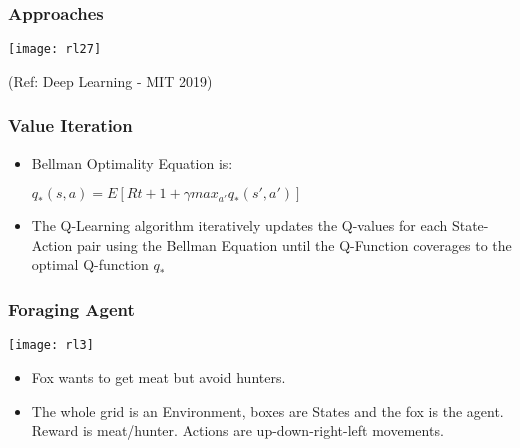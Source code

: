 \begin{frame}[fragile]\frametitle{Approaches}
\begin{center}
\texttt{[image: rl27]}
\end{center}

{\tiny (Ref: Deep Learning - MIT 2019)}

\end{frame}

\begin{frame}[fragile]\frametitle{Value Iteration}

\begin{itemize}
\item Bellman Optimality Equation is:

$q_{*}(s,a) = E[R{t+1} + \gamma max_{a'} q_{*}(s',a')]$


\item The Q-Learning algorithm iteratively updates the Q-values for each State-Action pair using the Bellman Equation until the Q-Function coverages to the optimal Q-function $q_*$
\end{itemize}

\end{frame}

\begin{frame}[fragile]\frametitle{Foraging Agent}

\begin{center}
\texttt{[image: rl3]}
\end{center}

\begin{itemize}
\item Fox wants to get meat but avoid hunters.
\item The whole grid is an Environment, boxes are States and the fox is the agent. Reward is meat/hunter. Actions are up-down-right-left movements.
\end{itemize}

\end{frame}


